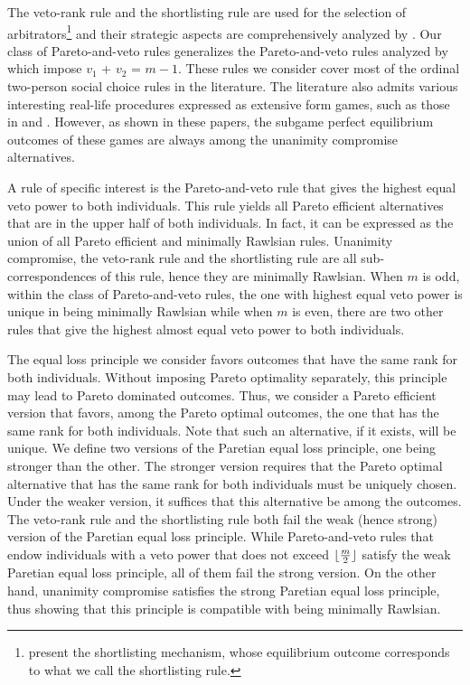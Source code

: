 \documentclass[pagesize, twoside=off, bibliography=totoc, DIV=calc, fontsize=12pt, a4paper]{scrartcl}
\begin{document}
The veto-rank rule and the shortlisting rule are used for the selection of arbitrators\footnote{ present the shortlisting mechanism, whose equilibrium outcome corresponds to what we call the shortlisting rule.} and their strategic aspects are comprehensively analyzed by \citet{Clippel}. Our class of Pareto-and-veto rules generalizes the Pareto-and-veto rules analyzed by \citet{laslier2021solution} which impose $v_1$ + $v_2$ = $m-1$. These rules we consider cover most of the ordinal two-person social choice rules in the literature. The literature also admits various interesting real-life procedures expressed as extensive form games, such as those in \citet{anbarci1993noncooperative, anbarci2006finite} and \citet{barbera2022compromising}. However, as shown in these papers, the subgame perfect equilibrium outcomes of these games are always among the unanimity compromise alternatives. 

A rule of specific interest is the Pareto-and-veto rule that gives the highest equal veto power to both individuals. This rule yields all Pareto efficient alternatives that are in the upper half of both individuals. In fact, it can be expressed as the union of all Pareto efficient and minimally Rawlsian rules. Unanimity compromise, the veto-rank rule and the shortlisting rule are all sub-correspondences of this rule, hence they are minimally Rawlsian. When $m$ is odd, within the class of Pareto-and-veto rules, the one with highest equal veto power is unique in being minimally Rawlsian while when $m$ is even, there are two other rules that give the highest almost equal veto power to both individuals.

The equal loss principle we consider favors outcomes that have the same rank for both individuals. Without imposing Pareto optimality separately, this principle may lead to Pareto dominated outcomes. Thus, we consider a Pareto efficient version that favors, among the Pareto optimal outcomes, the one that has the same rank for both individuals. Note that such an alternative, if it exists, will be unique. We define two versions of the Paretian equal loss principle, one being stronger than the other. The stronger version requires that the Pareto optimal alternative that has the same rank for both individuals must be uniquely chosen. Under the weaker version, it suffices that this alternative be among the outcomes. The veto-rank rule and the shortlisting rule both fail the weak (hence strong) version of the Paretian equal loss principle. While Pareto-and-veto rules that endow individuals with a veto power that does not exceed $\lfloor\frac{m}{2}\rfloor$ satisfy the weak Paretian equal loss principle, all of them fail the strong version. On the other hand, unanimity compromise satisfies the strong Paretian equal loss principle, thus showing that this principle is compatible with being minimally Rawlsian.
 
\end{document}

